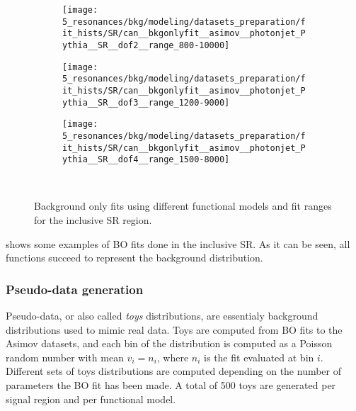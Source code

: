 \begin{figure}[ht!]
    \centering
    \begin{subfigure}[h]{0.32\linewidth}
        \centering
        \texttt{[image: 5\_resonances/bkg/modeling/datasets\_preparation/fit\_hists/SR/can\_\_bkgonlyfit\_\_asimov\_\_photonjet\_Pythia\_\_SR\_\_dof2\_\_range\_800-10000]}
    \end{subfigure}
    \hfill
    \begin{subfigure}[h]{0.32\linewidth}
        \centering
        \texttt{[image: 5\_resonances/bkg/modeling/datasets\_preparation/fit\_hists/SR/can\_\_bkgonlyfit\_\_asimov\_\_photonjet\_Pythia\_\_SR\_\_dof3\_\_range\_1200-9000]}
    \end{subfigure}
    \hfill
    \begin{subfigure}[h]{0.32\linewidth}
        \centering
        \texttt{[image: 5\_resonances/bkg/modeling/datasets\_preparation/fit\_hists/SR/can\_\_bkgonlyfit\_\_asimov\_\_photonjet\_Pythia\_\_SR\_\_dof4\_\_range\_1500-8000]}
    \end{subfigure}\\
    \caption{Background only fits using different functional models and fit ranges for the inclusive SR region.}
    \label{fig:bkg:modeling:preparation:asimov_bkgonly:bkgonly_fits}
\end{figure}

\Fig{\ref{fig:bkg:modeling:preparation:asimov_bkgonly:bkgonly_fits}} shows some examples of \ac{BO} fits done in the inclusive SR. As it can be seen, all functions succeed to represent the background distribution.





\subsubsection{Pseudo-data generation}
\label{subsubsec:bkg:modeling:preparation:toys}

Pseudo-data, or also called \textit{toys} distributions, are essentialy background distributions used to mimic real data. Toys are computed from \ac{BO} fits to the Asimov datasets, and each bin of the distribution is computed as a Poisson random number with mean \(v_i = n_i\), where \(n_i\) is the fit evaluated at bin \(i\). Different sets of toys distributions are computed depending on the number of parameters the \ac{BO} fit has been made. A total of 500 toys are generated per signal region and per functional model.

